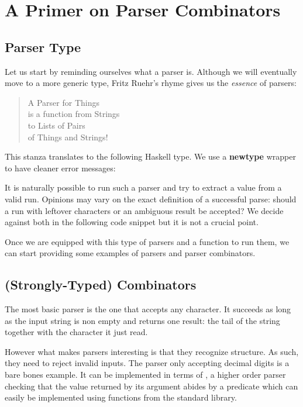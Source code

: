 \section{A Primer on Parser Combinators}

\subsection{Parser Type}

Let us start by reminding ourselves what a parser is. Although we
will eventually move to a more generic type, Fritz Ruehr's rhyme
gives us the \emph{essence} of parsers:

\begin{verse}
  A Parser for Things\\
  is a function from Strings\\
  to Lists of Pairs\\
  of Things and Strings!
\end{verse}

This stanza translates to the following Haskell type. We use a \textbf{newtype}
wrapper to have cleaner error messages:


It is naturally possible to run such a parser and try to extract
a value from a valid run. Opinions may vary on the exact definition
of a successful parse: should a run with leftover characters or an
ambiguous result be accepted? We decide against both in the following
code snippet but it is not a crucial point.


Once we are equipped with this type of parsers and a function to run
them, we can start providing some examples of parsers and parser combinators.

\subsection{(Strongly-Typed) Combinators}

The most basic parser is the one that accepts any character.
It succeeds as long as the input string is non empty and
returns one result: the tail of the string together with the
character it just read.


However what makes parsers interesting is that they recognize
structure. As such, they need to reject invalid inputs. The
parser only accepting decimal digits is a bare bones example.
It can be implemented in terms of , a higher
order parser checking that the value returned by its argument
abides by a predicate which can easily be implemented using
functions from the standard library.

